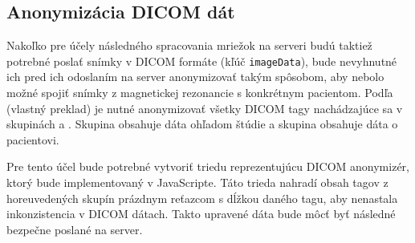 \subsection {Anonymizácia DICOM dát}
Nakoľko pre účely následného spracovania mriežok na serveri budú taktiež potrebné poslať snímky v DICOM formáte (kľúč \texttt{imageData}), bude nevyhnutné ich pred ich odoslaním na server anonymizovať takým spôsobom, aby nebolo možné spojiť snímky z magnetickej rezonancie s konkrétnym pacientom. Podľa \cite{Varma_2012} (vlastný preklad) je nutné anonymizovať všetky DICOM tagy nachádzajúce sa v skupinách  a . Skupina  obsahuje dáta ohľadom štúdie a skupina  obsahuje dáta o pacientovi.

Pre tento účel bude potrebné vytvoriť triedu reprezentujúcu DICOM anonymizér, ktorý bude implementovaný v JavaScripte. Táto trieda nahradí obsah tagov z horeuvedených skupín prázdnym reťazcom s dĺžkou daného tagu, aby nenastala inkonzistencia v DICOM dátach. Takto upravené dáta bude môcť byť následné bezpečne poslané na server.

